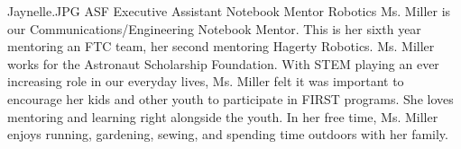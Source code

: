 {Jaynelle.JPG} 
{ASF Executive Assistant} 
{Notebook Mentor} 
{Robotics}
{
Ms. Miller is our Communications/Engineering Notebook Mentor. This is her sixth year mentoring an FTC team, her second mentoring Hagerty Robotics. Ms. Miller works for the Astronaut Scholarship Foundation. With STEM playing an ever increasing role in our everyday lives, Ms. Miller felt it was important to encourage her kids and other youth to participate in FIRST programs. She loves mentoring and learning right alongside the youth. In her free time, Ms. Miller enjoys running, gardening, sewing, and spending time outdoors with her family.
}
